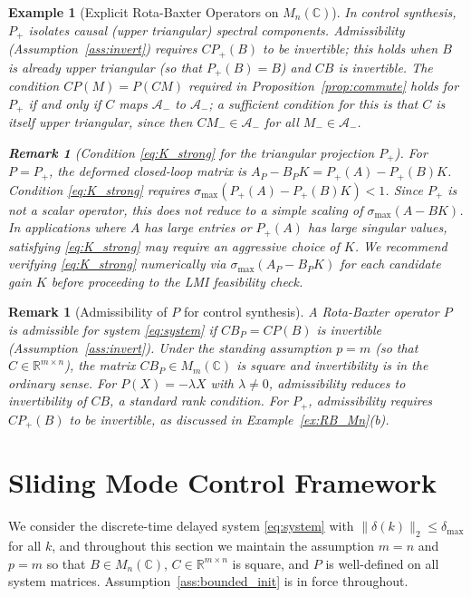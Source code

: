 \documentclass[10pt]{amsart}
\newcommand{\Ac}{\mathcal{A}}
\numberwithin{equation}{section}
\newtheorem{remark}[theorem]{Remark}
\newtheorem{example}[theorem]{Example}
\begin{document}
\begin{example}[Explicit Rota-Baxter Operators on \(M_n(\mathbb{C})\)]
In control synthesis, $P_+$ isolates causal (upper triangular) spectral components.
Admissibility (Assumption~\ref{ass:invert}) requires $CP_+(B)$ to be invertible; this
holds when $B$ is already upper triangular (so that $P_+(B)=B$) and $CB$ is invertible.
The condition $CP(M) = P(CM)$ required in Proposition~\ref{prop:commute} holds for $P_+$
if and only if $C$ maps $\Ac_-$ to $\Ac_-$; a sufficient condition for this is that $C$
is itself upper triangular, since then $CM_- \in \Ac_-$ for all $M_- \in \Ac_-$.

\begin{remark}[Condition \eqref{eq:K_strong} for the triangular projection $P_+$]
\label{rem:K_strong_Pplus}
For $P = P_+$, the deformed closed-loop matrix is $A_P - B_PK = P_+(A) - P_+(B)K$.
Condition \eqref{eq:K_strong} requires $\sigma_{\max}(P_+(A) - P_+(B)K) < 1$.
Since $P_+$ is not a scalar operator, this does not reduce to a simple scaling of
$\sigma_{\max}(A-BK)$. In applications where $A$ has large entries or $P_+(A)$
has large singular values, satisfying \eqref{eq:K_strong} may require an aggressive
choice of $K$. We recommend verifying \eqref{eq:K_strong} numerically via
$\sigma_{\max}(A_P - B_PK)$ for each candidate gain $K$ before proceeding to the
LMI feasibility check.
\end{remark}
\end{example}

\begin{remark}[Admissibility of $P$ for control synthesis]\label{rem:admissible}
A Rota-Baxter operator $P$ is \emph{admissible} for system \eqref{eq:system} if
$CB_P = CP(B)$ is invertible (Assumption~\ref{ass:invert}). Under the standing
assumption $p = m$ (so that $C \in \mathbb{R}^{m\times n}$), the matrix
$CB_P \in M_m(\mathbb{C})$ is square and invertibility is in the ordinary sense. For
$P(X)=-\lambda X$ with $\lambda \neq 0$, admissibility reduces to invertibility of
$CB$, a standard rank condition. For $P_+$, admissibility requires $CP_+(B)$ to be
invertible, as discussed in Example~\ref{ex:RB_Mn}(b).
\end{remark}


\section{Sliding Mode Control Framework}\label{sec:smc}
We consider the discrete-time delayed system \eqref{eq:system} with
$\|\delta(k)\|_2 \leq \delta_{\max}$ for all $k$, and throughout this section we
maintain the assumption $m=n$ and $p=m$ so that $B \in M_n(\mathbb{C})$,
$C \in \mathbb{R}^{m\times n}$ is square, and $P$ is well-defined on all system matrices.
Assumption~\ref{ass:bounded_init} is in force throughout.
\end{document}
